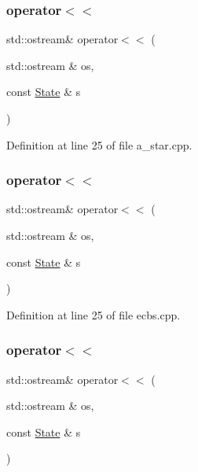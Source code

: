 \subsubsection{\texorpdfstring{operator$<$$<$}{operator<<}\hspace{0.1cm}{\footnotesize\ttfamily [1/4]}}
{\footnotesize\ttfamily std\+::ostream\& operator$<$$<$ (\begin{DoxyParamCaption}\item[{std\+::ostream \&}]{os,  }\item[{const \hyperlink{struct_state}{State} \&}]{s }\end{DoxyParamCaption})\hspace{0.3cm}{\ttfamily [friend]}}



Definition at line 25 of file a\+\_\+star.\+cpp.

\mbox{\label{struct_state_a5604754e63c801276d20313c05a68847}} 
\subsubsection{\texorpdfstring{operator$<$$<$}{operator<<}\hspace{0.1cm}{\footnotesize\ttfamily [2/4]}}
{\footnotesize\ttfamily std\+::ostream\& operator$<$$<$ (\begin{DoxyParamCaption}\item[{std\+::ostream \&}]{os,  }\item[{const \hyperlink{struct_state}{State} \&}]{s }\end{DoxyParamCaption})\hspace{0.3cm}{\ttfamily [friend]}}



Definition at line 25 of file ecbs.\+cpp.

\mbox{\label{struct_state_a5604754e63c801276d20313c05a68847}} 
\subsubsection{\texorpdfstring{operator$<$$<$}{operator<<}\hspace{0.1cm}{\footnotesize\ttfamily [3/4]}}
{\footnotesize\ttfamily std\+::ostream\& operator$<$$<$ (\begin{DoxyParamCaption}\item[{std\+::ostream \&}]{os,  }\item[{const \hyperlink{struct_state}{State} \&}]{s }\end{DoxyParamCaption})\hspace{0.3cm}{\ttfamily [friend]}}



